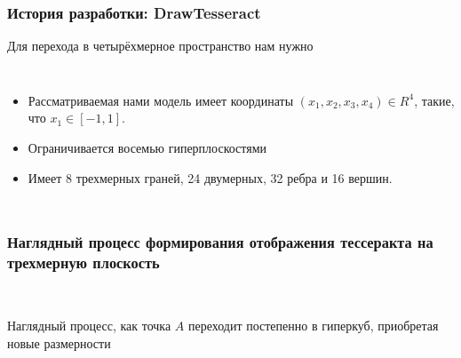 \documentclass[10pt,pdf,hyperref={unicode}]{beamer}
\begin{document}
\begin{frame}
\begin{frame}
\frametitle{История разработки: {\bf DrawTesseract}}
	Для перехода в четырёхмерное пространство нам нужно 
\begin{columns}
	{\small
	\begin{itemize}
		\item Рассматриваемая нами модель имеет координаты $(x_1,x_2,x_3,x_4) \in R^4$, такие, что $x_1 \in [ -1,1 ]$. 
		\item Ограничивается восемью гиперплоскостями	
		\item Имеет 8 трехмерных граней, 24 двумерных, 32 ребра и 16 вершин.
	\end{itemize}
}
	\clearpage
\end{columns}
\end{frame}

\begin{frame}
\frametitle{Наглядный процесс формирования отображения тессеракта на трехмерную плоскость}
\begin{center}
	 \\
\end{center}
Наглядный процесс, как точка $A$ переходит постепенно в гиперкуб, приобретая новые размерности
\end{frame}



\end{frame}
\end{document}
